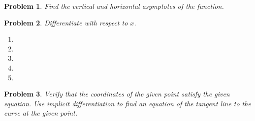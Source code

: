 \documentclass[12pt]{article}
\newtheorem{problem}{Problem}
\renewcommand{\fcProblemRef}{\theproblem.\theenumi}
\begin{document}
\begin{problem}
Find the vertical and horizontal asymptotes of the function.


\end{problem}


\begin{problem}
Differentiate with respect to $x$.
\begin{enumerate}[ref={\fcProblemRef}]
\item 
\item 
\item 
\item 
\item 
\end{enumerate}
\end{problem}







\begin{problem}
Verify that the coordinates of the given point satisfy the given equation. Use implicit differentiation to find an equation of the tangent line to the curve at the given point. 


\end{problem}

\end{document}
